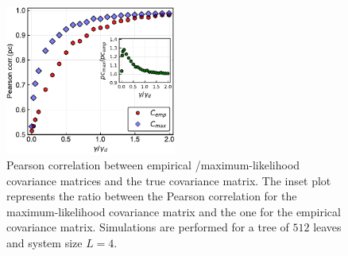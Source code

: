 \documentclass[preprint,amsmath,amssymb,superscriptaddress,showpacs,pre]{revtex4-1}
\providecommand{\DIFaddbeginFL}{} %
\providecommand{\DIFaddendFL}{} %
\providecommand{\DIFdelbeginFL}{} %
\providecommand{\DIFdelendFL}{} %
\newcommand{\DIFscaledelfig}{0.5}
\newlength{\DIFdelgraphicswidth} %
\newlength{\DIFdelgraphicsheight} %
\newcommand{\DIFaddincludegraphics}[2][]{{\color{blue}\fbox{\DIFOincludegraphics[#1]{#2}}}} %
\newcommand{\DIFdelincludegraphics}[2][]{%
\sbox{\DIFdelgraphicsbox}{\DIFOincludegraphics[#1]{#2}}%
\settoboxwidth{\DIFdelgraphicswidth}{\DIFdelgraphicsbox} %
\settoboxtotalheight{\DIFdelgraphicsheight}{\DIFdelgraphicsbox} %
\scalebox{\DIFscaledelfig}{%
\parbox[b]{\DIFdelgraphicswidth}{\usebox{\DIFdelgraphicsbox}\\[-\baselineskip] \rule{\DIFdelgraphicswidth}{0em}}\llap{\resizebox{\DIFdelgraphicswidth}{\DIFdelgraphicsheight}{%
\setlength{\unitlength}{\DIFdelgraphicswidth}%
\begin{picture}(1,1)%
\thicklines\linethickness{2pt} %
{\color[rgb]{1,0,0}\put(0,0){\framebox(1,1){}}}%
{\color[rgb]{1,0,0}\put(0,0){\line( 1,1){1}}}%
{\color[rgb]{1,0,0}\put(0,1){\line(1,-1){1}}}%
\end{picture}%
}\hspace*{3pt}}} %
} %
\DeclareRobustCommand{\DIFaddbeginFL}{\DIFOaddbeginFL \let\includegraphics\DIFaddincludegraphics} %
\DeclareRobustCommand{\DIFaddendFL}{\DIFOaddendFL \let\includegraphics\DIFOincludegraphics} %
\DeclareRobustCommand{\DIFdelbeginFL}{\DIFOdelbeginFL \let\includegraphics\DIFdelincludegraphics} %
\DeclareRobustCommand{\DIFdelendFL}{\DIFOaddendFL \let\includegraphics\DIFOincludegraphics} %
\begin{document}
\begin{figure}[!htb]
	\centering
	\DIFdelbeginFL %
\DIFdelendFL \DIFaddbeginFL \includegraphics[keepaspectratio=true,width=0.5\textwidth]{Figures/corr_C_L4_balanced_tree_100_rep.pdf}
	\DIFaddendFL \caption{ Pearson correlation between empirical /maximum-likelihood   covariance matrices and the true covariance matrix. The inset plot represents the ratio between the Pearson correlation for the  maximum-likelihood covariance matrix and the one for the empirical covariance matrix. Simulations are performed for a tree of $512$ leaves  and  system size $L=4$.}
	\label{fig:pears_L4}
\end{figure}
\end{document}
